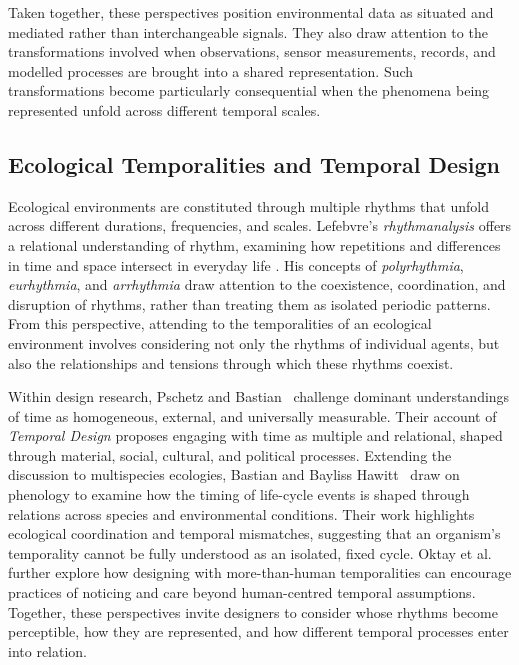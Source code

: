 \documentclass[manuscript,review,anonymous]{acmart}
\begin{document}
Taken together, these perspectives position environmental data as situated and mediated rather than interchangeable signals. They also draw attention to the transformations involved when observations, sensor measurements, records, and modelled processes are brought into a shared representation. Such transformations become particularly consequential when the phenomena being represented unfold across different temporal scales.

\subsection{Ecological Temporalities and Temporal Design}

Ecological environments are constituted through multiple rhythms that unfold across different durations, frequencies, and scales. Lefebvre's \emph{rhythmanalysis} offers a relational understanding of rhythm, examining how repetitions and differences in time and space intersect in everyday life \cite{lefebvre2004}. His concepts of \emph{polyrhythmia}, \emph{eurhythmia}, and \emph{arrhythmia} draw attention to the coexistence, coordination, and disruption of rhythms, rather than treating them as isolated periodic patterns. From this perspective, attending to the temporalities of an ecological environment involves considering not only the rhythms of individual agents, but also the relationships and tensions through which these rhythms coexist.

Within design research, Pschetz and Bastian~\cite{pschetz2018} challenge dominant understandings of time as homogeneous, external, and universally measurable. Their account of \emph{Temporal Design} proposes engaging with time as multiple and relational, shaped through material, social, cultural, and political processes. Extending the discussion to multispecies ecologies, Bastian and Bayliss Hawitt~\cite{bastian2022} draw on phenology to examine how the timing of life-cycle events is shaped through relations across species and environmental conditions. Their work highlights ecological coordination and temporal mismatches, suggesting that an organism's temporality cannot be fully understood as an isolated, fixed cycle. Oktay et al.~\cite{oktay2024} further explore how designing with more-than-human temporalities can encourage practices of noticing and care beyond human-centred temporal assumptions. Together, these perspectives invite designers to consider whose rhythms become perceptible, how they are represented, and how different temporal processes enter into relation.
\end{document}
